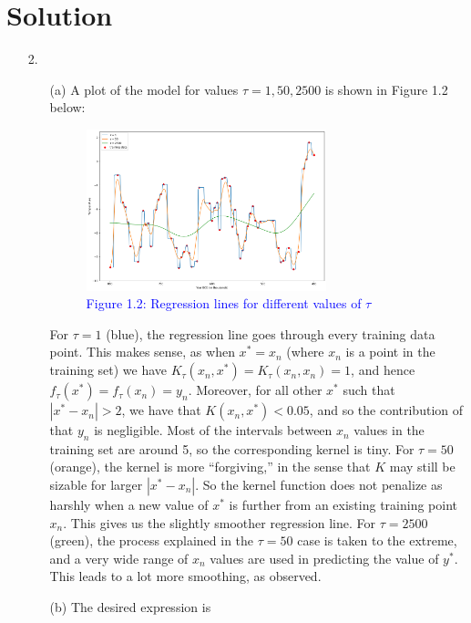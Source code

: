 \documentclass[submit]{../harvardml}
\newenvironment{solution}
  {\color{blue}\section*{Solution}}
{}
\begin{document}
\begin{solution}
\begin{enumerate}
\begin{enumerate}
    \end{enumerate}
    \item[2.]
    \begin{enumerate}
        \item[(a)] A plot of the model for values $\tau = 1,50,2500$ is shown in Figure 1.2 below:
        \begin{figure}[H]
            \centering
            \includegraphics[width=0.7\textwidth]{img_output/p1.2a.png}
            \caption*{\textcolor{blue}{Figure 1.2: Regression lines for different values of $\tau$}}
            \label{fig:q1.2}
        \end{figure}
        For $\tau=1$ (blue), the regression line goes through every training data point. This makes sense, as when $x^*=x_n$ (where $x_n$ is a point in the training set) we have $K_\tau (x_n,x^*) = K_\tau (x_n,x_n) = 1$, and hence $f_\tau (x^*) = f_\tau (x_n) = y_n$. Moreover, for all other $x^*$ such that $|x^* - x_n| > 2$, we have that $K(x_n,x^*) < 0.05$, and so the contribution of that $y_n$ is negligible. Most of the intervals between $x_n$ values in the training set are around 5, so the corresponding kernel is tiny.
        \newline \newline
        For $\tau=50$ (orange), the kernel is more ``forgiving,'' in the sense that $K$ may still be sizable for larger $|x^* - x_n|$. So the kernel function does not penalize as harshly when a new value of $x^*$ is further from an existing training point $x_n$. This gives us the slightly smoother regression line.
        \newline \newline 
        For $\tau=2500$ (green), the process explained in the $\tau=50$ case is taken to the extreme, and a very wide range of $x_n$ values are used in predicting the value of $y^*$. This leads to a lot more smoothing, as observed.
        \item[(b)] The desired expression is

\end{enumerate}
\end{enumerate}
\end{solution}
\end{document}
